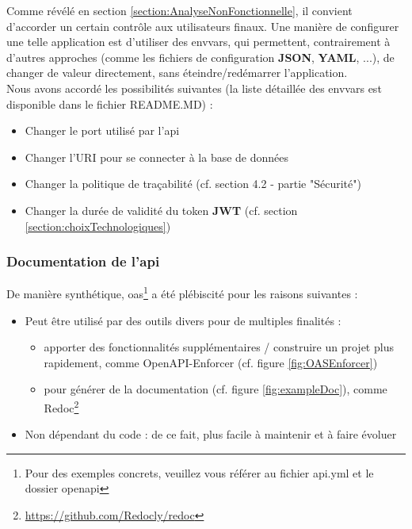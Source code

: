 Comme révélé en section \ref{section:AnalyseNonFonctionnelle}, il convient d'accorder un certain contrôle aux utilisateurs finaux.
Une manière de configurer une telle application est d'utiliser des \glspl{envvar}, 
qui permettent, contrairement à d'autres approches (comme les fichiers de configuration \textbf{JSON}, \textbf{YAML}, ...), 
de changer de valeur directement, sans éteindre/redémarrer l'application. \\

Nous avons accordé les possibilités suivantes (la liste détaillée des \glspl{envvar} est disponible dans le fichier README.MD) :

\begin{itemize}
    \item Changer le port utilisé par l'\Gls{api}
    \item Changer l'URI pour se connecter à la base de données
    \item Changer la politique de traçabilité (cf. section 4.2 - partie "Sécurité")
    \item Changer la durée de validité du token \textbf{JWT} (cf. section \ref{section:choixTechnologiques})
\end{itemize}

\subsubsection{Documentation de l'\Gls{api}}

De manière synthétique, \Gls{oas}\footnote{
    Pour des exemples concrets, veuillez vous référer au fichier api.yml et le dossier openapi
} a été plébiscité pour les raisons suivantes :

\begin{itemize}
    \item Peut être utilisé par des outils divers pour de multiples finalités :
    \begin{itemize}[nosep,noitemsep,topsep=0pt,partopsep=0pt,after=\vspace*{2pt}]
        \item apporter des fonctionnalités supplémentaires / construire un projet plus rapidement, comme OpenAPI-Enforcer (cf. figure \ref{fig:OASEnforcer})
        \item pour générer de la documentation (cf. figure \ref{fig:exampleDoc}), comme Redoc\footnote{
            \url{https://github.com/Redocly/redoc}
        }
    \end{itemize}
    \item Non dépendant du code : de ce fait, plus facile à maintenir et à faire évoluer
\end{itemize}

